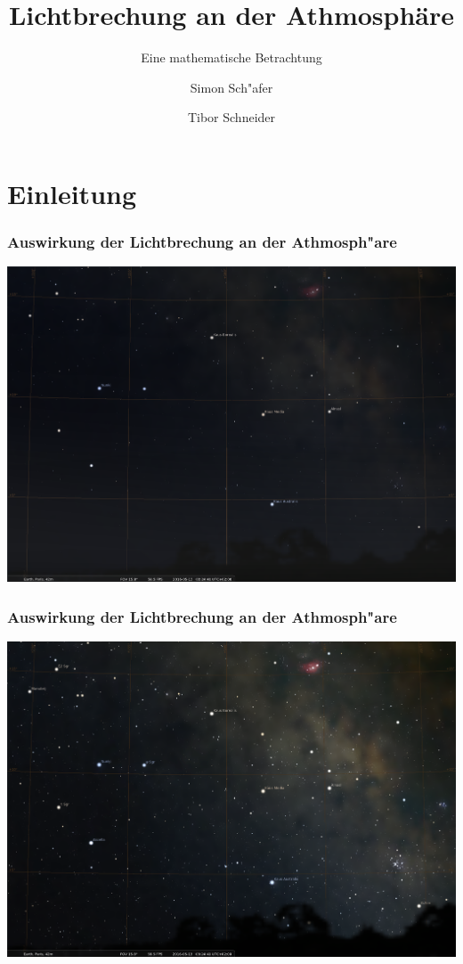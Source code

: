 \documentclass{beamer}
\title[Licht] %
{Lichtbrechung an der Athmosphäre}
\subtitle{Eine mathematische Betrachtung}
\author[Schaefer, Schneider] %
{Simon Sch"afer \and Tibor Schneider}
\institute[hsr] %
{
  HSR Hochschule f"ur Technik Rapperswil
}
\begin{document}
  \frame{\titlepage}  

  
  \section{Einleitung}
  \begin{frame}
    \frametitle{Auswirkung der Lichtbrechung an der Athmosph"are}
    \includegraphics[width=\textwidth, trim={0 1cm 0 0}, clip]{images/stellarium_athmosphere}
  \end{frame} 
  \begin{frame}
    \frametitle{Auswirkung der Lichtbrechung an der Athmosph"are}
    \includegraphics[width=\textwidth, trim={0 1cm 0 0}, clip]{images/stellarium_no_athmosphere}
  \end{frame} 
  
\end{document}
